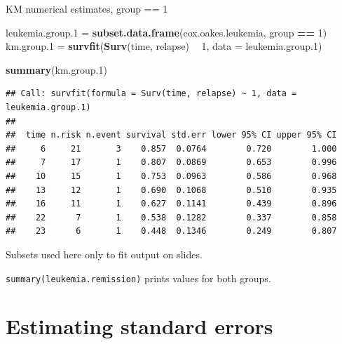 \documentclass[ignorenonframetext,]{beamer}
\newenvironment{Shaded}{\begin{snugshade}}{\end{snugshade}}
\newcommand{\DataTypeTok}[1]{\textcolor[rgb]{0.13,0.29,0.53}{#1}}
\newcommand{\DecValTok}[1]{\textcolor[rgb]{0.00,0.00,0.81}{#1}}
\newcommand{\FloatTok}[1]{\textcolor[rgb]{0.00,0.00,0.81}{#1}}
\newcommand{\KeywordTok}[1]{\textcolor[rgb]{0.13,0.29,0.53}{\textbf{#1}}}
\newcommand{\NormalTok}[1]{#1}
\newcommand{\OperatorTok}[1]{\textcolor[rgb]{0.81,0.36,0.00}{\textbf{#1}}}
\newcommand{\StringTok}[1]{\textcolor[rgb]{0.31,0.60,0.02}{#1}}
\begin{document}
\begin{frame}[fragile]{%
\protect\hypertarget{km-numerical-estimates-group-1}{%
KM numerical estimates, group == 1}}

\scriptsize

\begin{Shaded}
\begin{Highlighting}[]
\NormalTok{leukemia.group}\FloatTok{.1}\NormalTok{ =}\StringTok{ }\KeywordTok{subset.data.frame}\NormalTok{(cox.oakes.leukemia, group }\OperatorTok{==}\StringTok{ }\DecValTok{1}\NormalTok{)}
\NormalTok{km.group}\FloatTok{.1}\NormalTok{ =}\StringTok{ }\KeywordTok{survfit}\NormalTok{(}\KeywordTok{Surv}\NormalTok{(time, relapse) }\OperatorTok{~}\StringTok{ }\DecValTok{1}\NormalTok{, }\DataTypeTok{data =}\NormalTok{ leukemia.group}\FloatTok{.1}\NormalTok{)}

\KeywordTok{summary}\NormalTok{(km.group}\FloatTok{.1}\NormalTok{)}
\end{Highlighting}
\end{Shaded}

\begin{verbatim}
## Call: survfit(formula = Surv(time, relapse) ~ 1, data = leukemia.group.1)
## 
##  time n.risk n.event survival std.err lower 95% CI upper 95% CI
##     6     21       3    0.857  0.0764        0.720        1.000
##     7     17       1    0.807  0.0869        0.653        0.996
##    10     15       1    0.753  0.0963        0.586        0.968
##    13     12       1    0.690  0.1068        0.510        0.935
##    16     11       1    0.627  0.1141        0.439        0.896
##    22      7       1    0.538  0.1282        0.337        0.858
##    23      6       1    0.448  0.1346        0.249        0.807
\end{verbatim}

\normalsize

\vspace{1cm}

Subsets used here only to fit output on slides.

\texttt{summary(leukemia.remission)} prints values for both groups.

\end{frame}

\hypertarget{estimating-standard-errors}{%
\section{Estimating standard errors}\label{estimating-standard-errors}}
\end{document}
